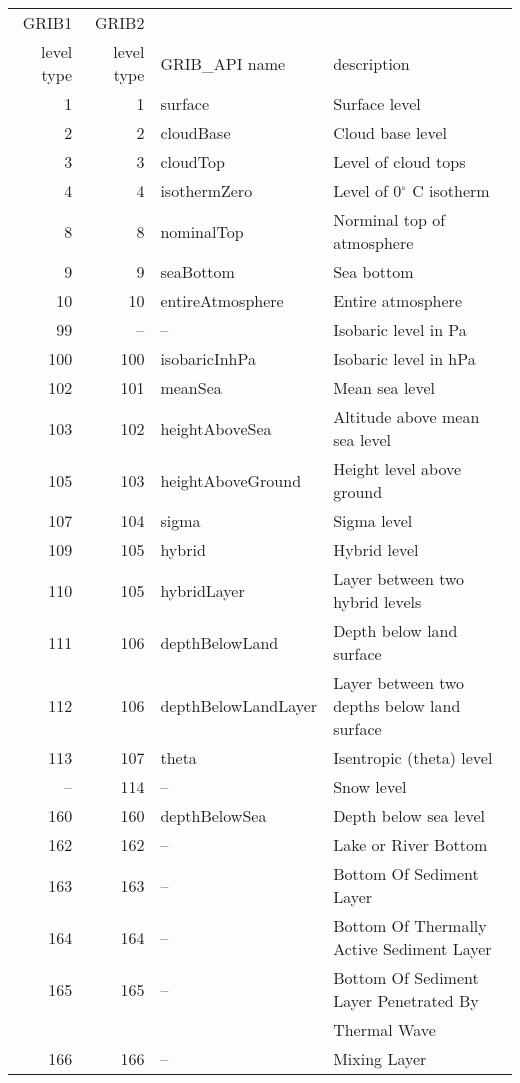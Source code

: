 \begin{tabular}{|r|r|l|l|}
\hline
\rowcolor[gray]{.9}
GRIB1  & GRIB2 & & \\
\rowcolor[gray]{.9}
 level type &  level type & GRIB\_API name & description \\
     1  &    1 & surface                        & Surface level \\
     2  &    2 & cloudBase                    & Cloud base level \\
     3  &    3 & cloudTop                     & Level of cloud tops \\
     4  &    4 & isothermZero               & Level of 0$^{\circ}$ C isotherm \\
     8  &    8 & nominalTop                 & Norminal top of atmosphere \\
     9  &    9 & seaBottom                   & Sea bottom \\
   10  &  10 & entireAtmosphere        & Entire atmosphere \\
   99  & --  & --                                & Isobaric level in Pa \\
 100  & 100 & isobaricInhPa              & Isobaric level in hPa \\
 102  & 101 & meanSea                     & Mean sea level \\
 103  & 102 & heightAboveSea          & Altitude above mean sea level \\
 105  & 103 & heightAboveGround    & Height level above ground \\
 107  & 104 & sigma                          & Sigma level \\
 109  & 105 & hybrid                         & Hybrid level      \\
 110  & 105 & hybridLayer                 & Layer between two hybrid levels   \\
 111  & 106 & depthBelowLand          & Depth below land surface    \\
 112  & 106 & depthBelowLandLayer & Layer between two depths below land surface   \\   
 113  & 107 & theta                           & Isentropic (theta) level \\
   --  & 114 & --                               & Snow level \\
 160  & 160 & depthBelowSea            & Depth below sea level    \\
 162  & 162 & --                               & Lake or River Bottom \\
 163  & 163 & --                               & Bottom Of Sediment Layer  \\
 164  & 164 & --                               & Bottom Of Thermally Active Sediment Layer  \\
 165  & 165 & --                               & Bottom Of Sediment Layer Penetrated By \\ 
         &        &                                    & Thermal Wave  \\
 166  & 166 & --                               & Mixing Layer  \\
\hline
\end{tabular}

